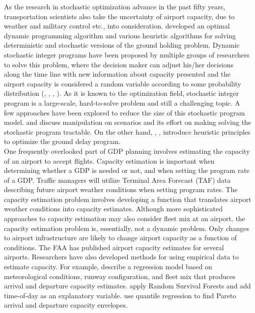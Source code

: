 \documentclass[12pt]{article}
\begin{document}
	\newline
	As the research in stochastic optimization advance in the past fifty years, transportation scientists also take the uncertainty of airport capacity, due to weather and military control etc., into consideration. \cite{terrab} developed an optimal dynamic programming algorithm and various heuristic algorithms for solving deterministic and stochastic versions of the ground holding problem. Dynamic stochastic integer programs have been proposed by multiple groups of researchers to solve this problem, where the decision maker can adjust his/her decisions along the time line with new information about capacity presented and the airport capacity is considered a random variable according to some probability distribution (\cite{richetta1994dynamic}, \cite{mukherjee2005dynamic}, \cite{mukherjee2007dynamic}, \cite{mukherjee2012ground}). As it is known to the optimization field, stochastic integer program is a large-scale, hard-to-solve problem and still a challenging topic. A few approaches have been explored to reduce the size of this stochastic program model. \cite{liu2007scenario} and \cite{liu2008scenario} discuss manipulation on scenarios and its effort on making solving the stochastic program tractable. On the other hand, \cite{ball2001collaborative}, \cite{vossen2006optimization}, \cite{ball2010ground} introduce heuristic principles to optimize the ground delay program.\\
	\newline
	One frequently overlooked part of GDP planning involves estimating the capacity of an airport to accept flights. Capacity estimation is important when determining whether a GDP is needed or not, and when setting the program rate of a GDP. Traffic managers will utilize Terminal Area Forecast (TAF) data describing future airport weather conditions when setting program rates.  The capacity estimation problem involves developing a function that translates airport weather conditions into capacity estimates.  Although more sophisticated approaches to capacity estimation may also consider fleet mix at an airport, the capacity estimation problem is, essentially, not a dynamic problem.  Only changes to airport infrastructure are likely to change airport capacity as a function of conditions.  The FAA has published airport capacity estimates for several airports.  Researchers have also developed methods for using empirical data to estimate capacity. For example, \cite{kim} describe a regression model based on meteorological conditions, runway configuration, and fleet mix that produces arrival and departure capacity estimates. \cite{gorripaty} apply Random Survival Forests and add time-of-day as an explanatory variable. \cite{ramnujam} use quantile regression to find Pareto arrival and departure capacity envelopes.\\
\end{document}

